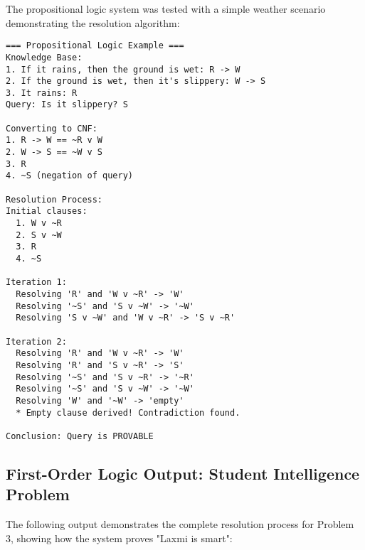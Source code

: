 \documentclass[11pt,a4paper]{article}
\begin{document}
The propositional logic system was tested with a simple weather scenario demonstrating the resolution algorithm:

\begin{lstlisting}[caption=Propositional Logic Resolution Output]
=== Propositional Logic Example ===
Knowledge Base:
1. If it rains, then the ground is wet: R -> W
2. If the ground is wet, then it's slippery: W -> S
3. It rains: R
Query: Is it slippery? S

Converting to CNF:
1. R -> W == ~R v W
2. W -> S == ~W v S
3. R
4. ~S (negation of query)

Resolution Process:
Initial clauses:
  1. W v ~R
  2. S v ~W
  3. R
  4. ~S

Iteration 1:
  Resolving 'R' and 'W v ~R' -> 'W'
  Resolving '~S' and 'S v ~W' -> '~W'
  Resolving 'S v ~W' and 'W v ~R' -> 'S v ~R'

Iteration 2:
  Resolving 'R' and 'W v ~R' -> 'W'
  Resolving 'R' and 'S v ~R' -> 'S'
  Resolving '~S' and 'S v ~R' -> '~R'
  Resolving '~S' and 'S v ~W' -> '~W'
  Resolving 'W' and '~W' -> 'empty'
  * Empty clause derived! Contradiction found.

Conclusion: Query is PROVABLE
\end{lstlisting}

\subsection{First-Order Logic Output: Student Intelligence Problem}

The following output demonstrates the complete resolution process for Problem 3, showing how the system proves "Laxmi is smart":
\end{document}
